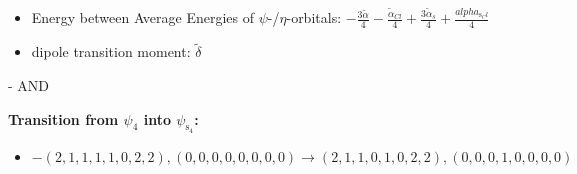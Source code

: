 \documentclass[12pt,a4paper]{article}
\begin{document}
\begin{itemize}
                \item Energy between Average Energies of $\psi$-/$\eta$-orbitals: $- \frac{3 \tilde{\alpha}}{4} - \frac{\tilde{\alpha}_{Cl}}{4} + \frac{3 \tilde{\alpha}_{s}}{4} + \frac{alpha_{\text{s}_Cl}}{4}$
            
            \item dipole transition moment: $\tilde{\delta}$
        
        \end{itemize}
        
 -  AND 

        \noindent\textbf{Transition from $\psi_{4}$ into $\psi_{\text{s}_{4}}$:}
        \begin{itemize}
            \item $- (2, 1, 1, 1, 1, 0, 2, 2), (0, 0, 0, 0, 0, 0, 0, 0) \rightarrow (2, 1, 1, 0, 1, 0, 2, 2), (0, 0, 0, 1, 0, 0, 0, 0)$
        

\end{itemize}
\end{document}
